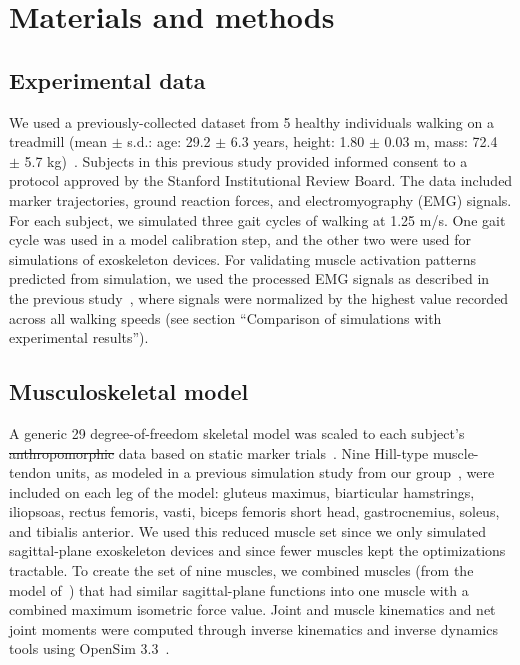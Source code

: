 \documentclass[10pt,letterpaper]{article}
\providecommand{\DIFdeltex}[1]{{\protect\color{red}\sout{#1}}}                      %
\providecommand{\DIFdelbegin}{} %
\providecommand{\DIFdelend}{} %
\providecommand{\DIFdel}[1]{\texorpdfstring{\DIFdeltex{#1}}{}} %
\newcommand{\DIFscaledelfig}{0.5}
\newlength{\DIFdelgraphicswidth} %
\newlength{\DIFdelgraphicsheight} %
\newcommand{\DIFdelincludegraphics}[2][]{%
\sbox{\DIFdelgraphicsbox}{\DIFOincludegraphics[#1]{#2}}%
\settoboxwidth{\DIFdelgraphicswidth}{\DIFdelgraphicsbox} %
\settoboxtotalheight{\DIFdelgraphicsheight}{\DIFdelgraphicsbox} %
\scalebox{\DIFscaledelfig}{%
\parbox[b]{\DIFdelgraphicswidth}{\usebox{\DIFdelgraphicsbox}\\[-\baselineskip] \rule{\DIFdelgraphicswidth}{0em}}\llap{\resizebox{\DIFdelgraphicswidth}{\DIFdelgraphicsheight}{%
\setlength{\unitlength}{\DIFdelgraphicswidth}%
\begin{picture}(1,1)%
\thicklines\linethickness{2pt} %
{\color[rgb]{1,0,0}\put(0,0){\framebox(1,1){}}}%
{\color[rgb]{1,0,0}\put(0,0){\line( 1,1){1}}}%
{\color[rgb]{1,0,0}\put(0,1){\line(1,-1){1}}}%
\end{picture}%
}*{3pt}}} %
} %
\DeclareRobustCommand{\DIFdelbegin}{\DIFOdelbegin \let\includegraphics\DIFdelincludegraphics} %
\DeclareRobustCommand{\DIFdelend}{\DIFOaddend \let\includegraphics\DIFOincludegraphics} %
\begin{document}
\section*{Materials and methods}

\subsection*{Experimental data}
We used a previously-collected dataset from 5 healthy individuals walking on a treadmill (mean $\pm$ s.d.: age: 29.2 $\pm$ 6.3 years, height: 1.80 $\pm$ 0.03 m, mass: 72.4 $\pm$ 5.7 kg)~\cite{Arnold:2013}. Subjects in this previous study provided informed consent to a protocol approved by the Stanford Institutional Review Board. The data included marker trajectories, ground reaction forces, and electromyography (EMG) signals. For each subject, we simulated three gait cycles of walking at 1.25 m/s. One gait cycle was used in a model calibration step, and the other two were used for simulations of exoskeleton devices. For validating muscle activation patterns predicted from simulation, we used the processed EMG signals as described in the previous study~\cite{Arnold:2013}, where signals were normalized by the highest value recorded across all walking speeds (see section ``Comparison of simulations with experimental results''). 

\subsection*{Musculoskeletal model}
A generic 29 degree-of-freedom skeletal model was scaled to each subject's \DIFdelbegin \DIFdel{anthropomorphic }\DIFdelend data based on static marker trials~\cite{Rajagopal:2016}. Nine Hill-type muscle-tendon units, as modeled in a previous simulation study from our group~\cite{Ong:2019}, were included on each leg of the model: gluteus maximus, biarticular hamstrings, iliopsoas, rectus femoris, vasti, biceps femoris short head, gastrocnemius, soleus, and tibialis anterior. We used this reduced muscle set since we only simulated sagittal-plane exoskeleton devices and since fewer muscles kept the optimizations tractable. To create the set of nine muscles, we combined muscles (from the model of~\cite{Rajagopal:2016}) that had similar sagittal-plane functions into one muscle with a combined maximum isometric force value. Joint and muscle kinematics and net joint moments were computed through inverse kinematics and inverse dynamics tools using OpenSim 3.3~\cite{Delp:2007}.
\end{document}
